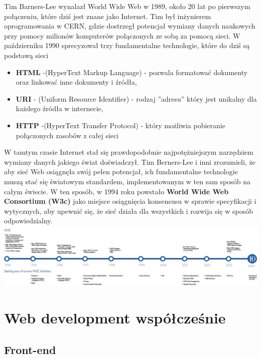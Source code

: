 \documentclass[12pt]{report}
\begin{document}
	Tim Barners-Lee wynalazł World Wide Web w  1989, około 20 lat po pierwszym połączeniu, które dziś jest znane 
	jako Internet. Tim był inżynierem oprogramowania w CERN, gdzie dostrzegł potencjał wymiany danych naukowych przy pomocy
	milionów komputerów połączonych ze sobą za pomocą sieci.
	\newline
	W październiku 1990 sprecyzował trzy fundamentalne technologie, które do dziś są podstawą sieci
	\begin{itemize}
	\item \textbf{HTML} -(HyperText Markup Language) - pozwala formatować dokumenty oraz linkować inne dokumenty i źródła,
	\item \textbf{URI} - (Uniform Resource Identifier) - rodzaj ''adresu'' który jest unikalny dla każdego źródła w internecie,
	\item \textbf{HTTP} -(HyperText Transfer Protocol) - który możliwia pobieranie połączonych zasobów z całej sieci
	\end{itemize}
	
	W tamtym czasie Internet stał się prawdopodobnie najpotężniejszym narzędziem wymiany danych jakiego świat doświadczył. 
	\newline
	Tim Berners-Lee i inni zrozumieli, że aby sieć Web osiągnęła swój pełen potencjał, ich fundamentalne technologie muszą stać
	się światowym standardem, implementowanym w ten sam sposób na całym świecie. W ten sposób, w 1994 roku powstało
	\textbf{World Wide Web Consortium (W3c)} jako miejsce osiągnięcia konsensusu w sprawie specyfikacji i wytycznych, aby upewnić
	się, że sieć działa dla wszystkich i rozwija się w sposób odpowiedzialny.
	\newline
	\includegraphics[width=\textwidth]{timeline.jpg}
	\newline
	\cite{history}
	
	\newpage 
	\chapter{Web development współcześnie}
	\section{Front-end}
	\newpage
\end{document}
